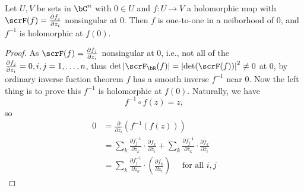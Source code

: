 \documentclass[lang=cn,12pt,fontset=none,a4paper]{beautybook}
\begin{document}
\begin{theorem}
   Let $U,V$ be sets in $\bC^n$ with $0\in U$ and $f: U\to V$ a holomorphic map with $\scrF (f)=\Diff[f_j]{z_i}$ nonsingular at $0$. Then $f$ is one-to-one in a neiborhood of $0$, and $f^{-1}$ is holomorphic at $f(0)$.
\end{theorem}
   \begin{proof}
      As $\scrF (f)=\Diff[f_j]{z_i}$ nonsingular at $0$, i.e., not all of the $\Diff[f_j]{z_i}=0, i,j=1,\dots,n$,  thus $\det \abs{\scrF_\bR (f)}=\abs{\det(\scrF(f))}^2\neq 0$ at $0$, by ordinary inverse fuction theorem $f$ has a smooth inverse $f^{-1}$ near $0$. Now the left  thing is to prove this $f^{-1}$ is holomorphic at $f(0)$. Naturally, we have 
      \[f^{-1} \circ f (z)=z,\]
       so 
       \[
         \begin{aligned}
            0 & =\frac{\partial}{\partial \bar{z}_i}\left(f^{-1}(f(z))\right) \\
            & =\sum_k \frac{\partial f_j^{-1}}{\partial z_k} \cdot \frac{\partial f_k}{\partial \bar{z}_i}+\sum_k \frac{\partial f_j^{-1}}{\partial \bar{z}_k} \cdot \frac{\partial \bar{f}_k}{\partial \bar{z}_i} \\
            & =\sum_k \frac{\partial f_j^{-1}}{\partial \bar{z}_k} \cdot\left(\frac{\overline{\partial f_k}}{\partial z_i}\right) \quad \text { for all } i, j
            \end{aligned}\]
   \end{proof}
      
\end{document}
